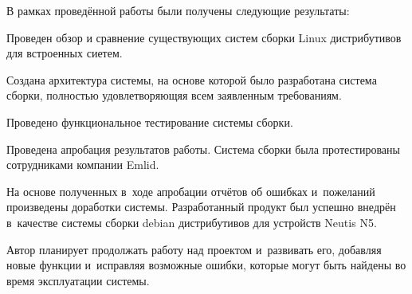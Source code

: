 
В рамках проведённой работы были получены следующие результаты:
\begin{dashitemize}
  \item Проведен обзор и сравнение существующих систем сборки Linux дистрибутивов для встроенных сиетем.
  \item Создана архитектура системы, на основе которой было разработана система сборки, полностью удовлетворяющяя всем заявленным требованиям.
  \item Проведено функциональное тестирование системы сборки.
  \item Проведена апробация результатов работы. Система сборки была протестированы сотрудниками компании Emlid.
  \item На основе полученных в~ходе апробации отчётов об ошибках и~пожеланий произведены доработки системы. Разработанный продукт был успешно внедрён в~качестве системы сборки debian дистрибутивов для устройств Neutis N5.
\end{dashitemize}

Автор планирует продолжать работу над проектом и~развивать его, добавляя новые функции и~исправляя возможные ошибки, которые могут быть найдены во время эксплуатации системы.

\newpage
